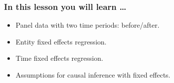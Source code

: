 

\begin{frame}
\frametitle{In this lesson you will learn \dots}
\begin{itemize}
\item Panel data with two time periods: before/after.
\item Entity fixed effects regression.
\item Time fixed effects regression.
\item Assumptions for causal inference with fixed effects.
\end{itemize}
\end{frame}

